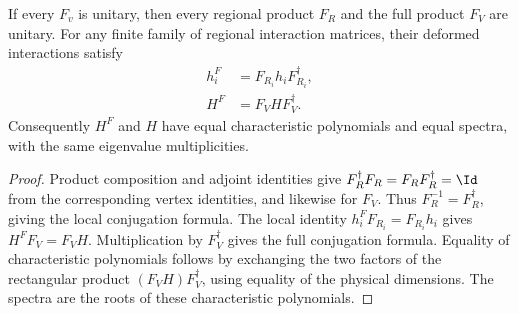 \begin{lemma}%
    \label{thm:peps_region_physical_unitary_conjugation}
    \leanok
    If every $F_v$ is unitary, then every regional product $F_R$ and
    the full product $F_V$ are unitary.
    For any finite family of regional interaction matrices,
    their deformed interactions satisfy
    \begin{align}
        h_i^F & =F_{R_i}h_iF_{R_i}^\dagger, \\
        H^F   & =F_VHF_V^\dagger.
    \end{align}
    Consequently $H^F$ and $H$ have equal characteristic polynomials
    and equal spectra, with the same eigenvalue multiplicities.
\end{lemma}

\begin{proof}\leanok
    Product composition and adjoint identities give
    $F_R^\dagger F_R=F_RF_R^\dagger=\Id$ from the corresponding
    vertex identities, and likewise for $F_V$.
    Thus $F_R^{-1}=F_R^\dagger$, giving the local conjugation formula.
    The local identity $h_i^FF_{R_i}=F_{R_i}h_i$ gives
    $H^FF_V=F_VH$. Multiplication by $F_V^\dagger$ gives the full
    conjugation formula. Equality of characteristic polynomials
    follows by exchanging the two factors of the rectangular product
    $(F_VH)F_V^\dagger$, using equality of the physical dimensions.
    The spectra are the roots of these characteristic polynomials.
\end{proof}
